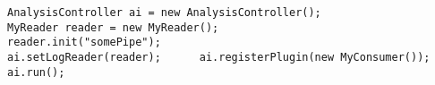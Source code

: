\begin{lstlisting}[label=listing:AnalysisController]
AnalysisController ai = new AnalysisController();
MyReader reader = new MyReader(); 
reader.init("somePipe"); 
ai.setLogReader(reader); 	  ai.registerPlugin(new MyConsumer());
ai.run();
\end{lstlisting}